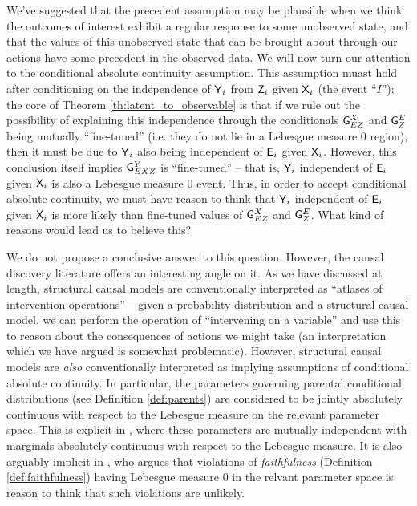 We've suggested that the precedent assumption may be plausible when we think the outcomes of interest exhibit a regular response to some unobserved state, and that the values of this unobserved state that can be brought about through our actions have some precedent in the observed data. We will now turn our attention to the conditional absolute continuity assumption. This assumption muast hold after conditioning on the independence of $\mathsf{Y}_i$ from $\mathsf{Z}_i$ given $\mathsf{X}_i$ (the event ``$I$''); the core of Theorem \ref{th:latent_to_observable} is that if we rule out the possibility of explaining this independence through the conditionals $\mathsf{G}^{X}_{EZ}$ and $\mathsf{G}^{E}_{Z}$ being mutually ``fine-tuned'' (i.e. they do not lie in a Lebesgue measure 0 region), then it must be due to $\mathsf{Y}_i$ also being independent of $\mathsf{E}_i$ given $\mathsf{X}_i$. However, this conclusion itself implies $\mathsf{G}^Y_{EXZ}$ is ``fine-tuned'' -- that is, $\mathsf{Y}_i$ independent of $\mathsf{E}_i$ given $\mathsf{X}_i$ is also a Lebesgue measure 0 event. Thus, in order to accept conditional absolute continuity, we must have reason to think that $\mathsf{Y}_i$ independent of $\mathsf{E}_i$ given $\mathsf{X}_i$ is more likely than fine-tuned values of $\mathsf{G}^{X}_{EZ}$ and $\mathsf{G}^{E}_{Z}$. What kind of reasons would lead us to believe this?

We do not propose a conclusive answer to this question. However, the causal discovery literature offers an interesting angle on it. As we have discussed at length, structural causal models are conventionally interpreted as ``atlases of intervention operations'' -- given a probability distribution and a structural causal model, we can perform the operation of ``intervening on a variable'' and use this to reason about the consequences of actions we might take (an interpretation which we have argued is somewhat problematic). However, structural causal models are \emph{also} conventionally interpreted as implying assumptions of conditional absolute continuity. In particular, the parameters governing parental conditional distributions (see Definition \ref{def:parents}) are considered to be jointly absolutely continuous with respect to the Lebesgue measure on the relevant parameter space. This is explicit in \citet{heckerman_learning_1995}, where these parameters are mutually independent with marginals absolutely continuous with respect to the Lebesgue measure. It is also arguably implicit in \citet{meek_strong_1995}, who argues that violations of \emph{faithfulness} (Definition \ref{def:faithfulness}) having Lebesgue measure 0 in the relvant parameter space is reason to think that such violations are unlikely.

